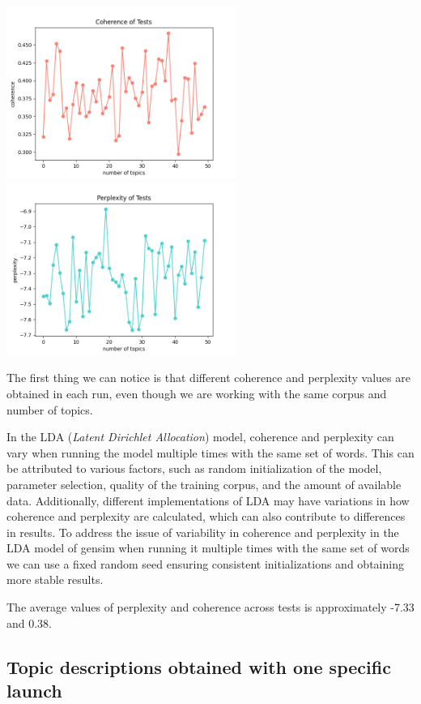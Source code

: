 \documentclass[10pt]{article} %
\begin{document}
	\begin{center}
		\includegraphics[width=7.5cm]{images/coherence_stopwords}
		\includegraphics[width=7.5cm]{images/perplexity_stopwords}
	\end{center}
	
	The first thing we can notice is that different coherence and perplexity values are obtained in each run, even though we are working with the same corpus and number of topics. 
		
	In the LDA (\textit{Latent Dirichlet Allocation}) model, coherence and perplexity can vary when running the model multiple times with the same set of words. This can be attributed to various factors, such as random initialization of the model, parameter selection, quality of the training corpus, and the amount of available data. Additionally, different implementations of LDA may have variations in how coherence and perplexity are calculated, which can also contribute to differences in results. To address the issue of variability in coherence and perplexity in the LDA model of gensim when running it multiple times with the same set of words we can use a fixed random seed ensuring consistent initializations and obtaining more stable results. 
	
	The average values of perplexity and coherence across tests is approximately -7.33 and 0.38. 
	
	\subsection{Topic descriptions obtained with one specific launch}
	
\end{document}
